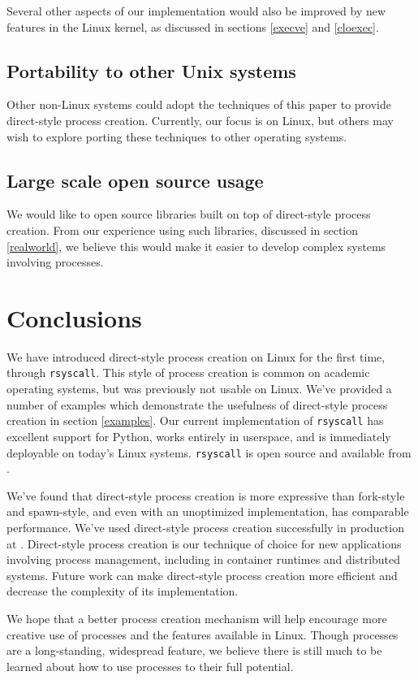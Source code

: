 \documentclass[letterpaper,twocolumn,10pt]{article}
\begin{document}
Several other aspects of our implementation would also be improved by new features in the Linux kernel,
as discussed in sections \ref{execve} and \ref{cloexec}.
\subsection{Portability to other Unix systems}
Other non-Linux systems
could adopt the techniques of this paper
to provide direct-style process creation.
Currently, our focus is on Linux,
but others may wish to explore porting these techniques to other operating systems.
\subsection{Large scale open source usage}
We would like to open source libraries built on top of direct-style process creation.
From our experience using such libraries, discussed in section \ref{realworld},
we believe this would make it easier to develop complex systems involving processes.
\section{Conclusions}\label{conclusions}
We have introduced direct-style process creation on Linux for the first time,
through \texttt{rsyscall}.
This style of process creation is common on academic operating systems,
but was previously not usable on Linux.
We've provided a number of examples which demonstrate the usefulness
of direct-style process creation in section \ref{examples}.
Our current implementation of \texttt{rsyscall} has excellent support for Python,
works entirely in userspace,
and is immediately deployable on today's Linux systems.
\texttt{rsyscall} is open source and available from \githuburl{}.

We've found that direct-style process creation is more expressive than fork-style and spawn-style,
and even with an unoptimized implementation, has comparable performance.
We've used direct-style process creation successfully in production at \twosigma{}.
Direct-style process creation is our technique of choice for new applications involving process management,
including in container runtimes and distributed systems.
Future work can make direct-style process creation more efficient
and decrease the complexity of its implementation.

We hope that a better process creation mechanism
will help encourage more creative use of processes and the features available in Linux.
Though processes are a long-standing, widespread feature,
we believe there is still much to be learned about how to use processes to their full potential.


\end{document}
